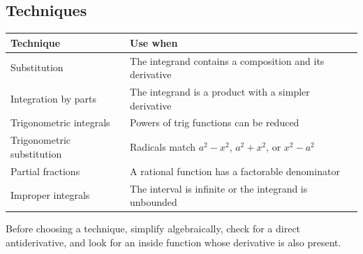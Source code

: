 \subsection*{Techniques}

\begin{center}
\begin{tabular}{ll}
\toprule
Technique & Use when \\
\midrule
Substitution & The integrand contains a composition and its derivative \\
Integration by parts & The integrand is a product with a simpler derivative \\
Trigonometric integrals & Powers of trig functions can be reduced \\
Trigonometric substitution & Radicals match \(a^2-x^2\), \(a^2+x^2\), or \(x^2-a^2\) \\
Partial fractions & A rational function has a factorable denominator \\
Improper integrals & The interval is infinite or the integrand is unbounded \\
\bottomrule
\end{tabular}
\end{center}

\begin{remark*}[Method]
Before choosing a technique, simplify algebraically, check for a direct
antiderivative, and look for an inside function whose derivative is also
present.
\end{remark*}
